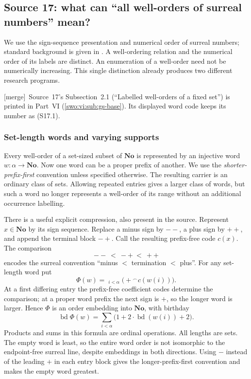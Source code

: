 \documentclass[11pt]{article}
\theoremstyle{definition}
\theoremstyle{remark}
\newcommand{\No}{\mathbf{No}}
\newcommand{\bd}{\operatorname{bd}}
\newcommand{\cat}{\mathbin{{}^\frown}}
\newcommand{\merge}{\textsf{[merge]}}
\begin{document}
\subsection{Source 17: what can ``all well-orders of surreal numbers'' mean?}
\label{swo:gs:sec:meanings}

We use the sign-sequence presentation and numerical order of surreal
numbers; standard background is given in \cite{Conway,Gonshor}.
A well-ordering relation and the numerical order of its labels are distinct.
An enumeration of a well-order need not be numerically increasing. This
single distinction already produces two different research programs.

\merge\ Source~17's Subsection~2.1 (``Labelled well-orders of a fixed set'')
is printed in Part~VI (\cref{swo:vi:sub:gs-base}). Its displayed word code
keeps its number as (S17.1).

\subsubsection{Set-length words and varying supports}
Every well-order of a set-sized subset of $\No$ is represented by an
injective word $w:\alpha\to\No$. Now one word can be a proper prefix of
another. We use the \emph{shorter-prefix-first} convention unless specified
otherwise. The resulting carrier is an ordinary class of sets. Allowing
repeated entries gives a larger class of words, but such a word no longer
represents a well-order of its range without an additional occurrence
labelling.

There is a useful explicit compression, also present in the source.
Represent $x\in\No$ by its sign sequence. Replace a minus sign by $--$,
a plus sign by $++$, and append the terminal block $-+$. Call the resulting
prefix-free code $c(x)$. The comparison
\[
 --\ <\ -+\ <\ ++
\]
encodes the surreal convention ``minus $<$ termination $<$ plus''.
For any set-length word put
\[\tag{S17.1}\label{swo:gs:eq:wordcode}
 \Phi(w)=\mathop{\mathbin{\cat}}_{i<\alpha}\bigl(+\cat c(w(i))\bigr).
\]
At a first differing entry the prefix-free coefficient codes determine the
comparison; at a proper word prefix the next sign is $+$, so the longer word
is larger. Hence $\Phi$ is an order embedding into $\No$, with birthday
\[
 \bd\Phi(w)=\sum_{i<\alpha}\bigl(1+2\cdot\bd(w(i))+2\bigr).
\]
Products and sums in this formula are ordinal operations. All lengths are
sets. The empty word is least, so the entire word order is not isomorphic
to the endpoint-free surreal line, despite embeddings in both directions.
Using $-$ instead of the leading $+$ in each entry block gives the
longer-prefix-first convention and makes the empty word greatest.
\end{document}
